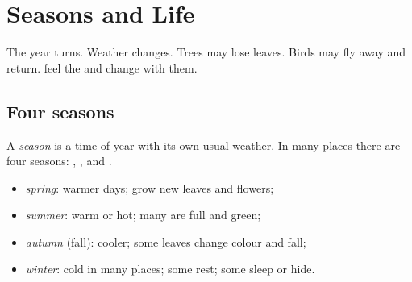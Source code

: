 \chapter{Seasons and Life}\label{ch:g1:seasons}

The year turns. Weather changes. Trees may lose leaves. Birds may
fly away and return.  feel the  and change with
them.

\section{Four seasons}

\begin{definition}[Season]\label{def:g1:seasons:season}
A \emph{season} is a time of year with its own usual
weather. In many places there are four seasons: , ,
 and .
\end{definition}


\begin{definition}\label{def:g1:seasons:four}
\begin{itemize}
  \item \emph{spring}: warmer days;  grow new
        leaves and flowers;
  \item \emph{summer}: warm or hot; many  are
        full and green;
  \item \emph{autumn} (fall): cooler; some leaves
        change colour and fall;
  \item \emph{winter}: cold in many places; some
         rest; some  sleep or hide.
\end{itemize}
\end{definition}

